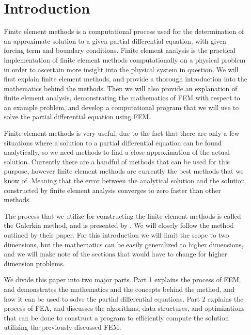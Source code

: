 \documentclass[../fem.tex]{subfile}
\begin{document}
\section{Introduction}%
\label{sec:introduction}

Finite element methods is a computational process used for the determination of
an approximate solution to a given partial differential equation, with given
forcing term and boundary conditions. Finite element analysis is the practical
implementation of finite element methods computationally on a physical problem
in order to ascertain more insight into the physical system in question. We
will first explain finite element methods, and provide a thorough introduction
into the mathematics behind the methods. Then we will also provide an
explanation of finite element analysis, demonstrating the mathematics of FEM
with respect to an example problem, and develop a computational program that we
will use to solve the partial differential equation using FEM.

Finite element methods is very useful, due to the fact that there are only a
few situations where a solution to a partial differential equation can be found
analytically, so we need methods to find a close approximation of the actual
solution. Currently there are a handful of methods that can be used for this
purpose, however finite element methods are currently the best methods that we
know of. Meaning that the error between the analytical solution and the
solution constructed by finite element analysis converges to zero faster than
other methods.

The process that we utilize for constructing the finite element methods is
called the Galerkin method, and is presented by \cite{KH}. We will closely
follow the method outlined by their paper. For this introduction we will limit
the scope to two dimensions, but the mathematics can be easily generalized to
higher dimensions, and we will make note of the sections that would have to
change for higher dimension problems.

We divide this paper into two major parts. Part 1 explains the process of FEM,
and demonstrates the mathematics and the concepts behind the method, and how it
can be used to solve the partial differential equations. Part 2 explains the
process of FEA, and discusses the algorithms, data structures, and
optimizations that can be done to construct a program to efficiently compute
the solution utilizing the previously discussed FEM.
\end{document}
